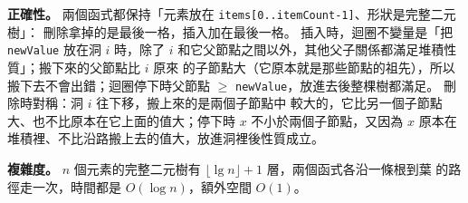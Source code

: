 \begin{pastsoln}
\textbf{正確性。} 兩個函式都保持「元素放在 \texttt{items[0..itemCount-1]}、形狀是完整二元樹」：
刪除拿掉的是最後一格，插入加在最後一格。 插入時，迴圈不變量是「把 \texttt{newValue} 放在洞
$i$ 時，除了 $i$ 和它父節點之間以外，其他父子關係都滿足堆積性質」；搬下來的父節點比 $i$ 原來
的子節點大（它原本就是那些節點的祖先），所以搬下去不會出錯；迴圈停下時父節點 $\ge$
\texttt{newValue}，放進去後整棵樹都滿足。 刪除時對稱：洞 $i$ 往下移，搬上來的是兩個子節點中
較大的，它比另一個子節點大、也不比原本在它上面的值大；停下時 $x$ 不小於兩個子節點，又因為
$x$ 原本在堆積裡、不比沿路搬上去的值大，放進洞裡後性質成立。

\textbf{複雜度。} $n$ 個元素的完整二元樹有 $\lfloor \lg n \rfloor + 1$ 層，兩個函式各沿一條根到葉
的路徑走一次，時間都是 $O(\log n)$，額外空間 $O(1)$。
\end{pastsoln}
